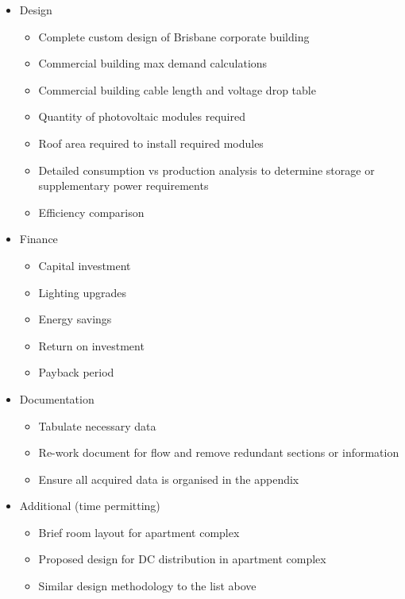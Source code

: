 \begin{itemize} [noitemsep]
	\item Design
	\begin{itemize}[noitemsep]
		\item Complete custom design of Brisbane corporate building
		\item Commercial building max demand calculations
		\item Commercial building cable length and voltage drop table
		\item Quantity of photovoltaic modules required
		\item Roof area required to install required modules
		\item Detailed consumption vs production analysis to determine storage or supplementary power requirements
		\item Efficiency comparison
	\end{itemize}

	\item Finance
	\begin{itemize}[noitemsep]
		\item Capital investment
		\item Lighting upgrades
		\item Energy savings
		\item Return on investment
		\item Payback period
	\end{itemize}

	\item Documentation
	\begin{itemize}[noitemsep]
		\item Tabulate necessary data
		\item Re-work document for flow and remove redundant sections or information
		\item Ensure all acquired data is organised in the appendix
	\end{itemize}

	\item Additional (time permitting)
	\begin{itemize}[noitemsep]
		\item Brief room layout for apartment complex
		\item Proposed design for DC distribution in apartment complex
		\item Similar design methodology to the list above
	\end{itemize}
\end{itemize}        
  
